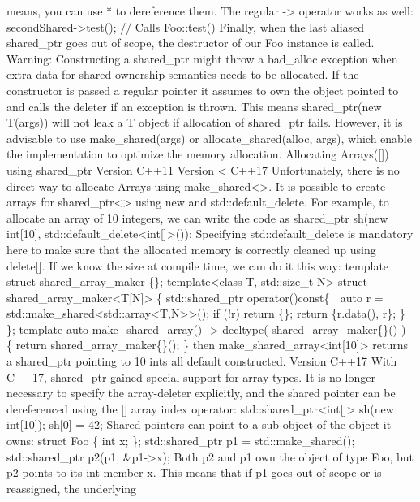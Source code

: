 means, you can use * to dereference them. The regular -\textgreater{}
operator works as well: secondShared-\textgreater test(); // Calls
Foo::test() Finally, when the last aliased shared\_ptr goes out of
scope, the destructor of our Foo instance is called. Warning:
Constructing a shared\_ptr might throw a bad\_alloc exception when extra
data for shared ownership semantics needs to be allocated. If the
constructor is passed a regular pointer it assumes to own the object
pointed to and calls the deleter if an exception is thrown. This means
shared\_ptr(new T(args)) will not leak a T object if allocation of
shared\_ptr fails. However, it is advisable to use make\_shared(args) or
allocate\_shared(alloc, args), which enable the implementation to
optimize the memory allocation. Allocating Arrays({[}{]}) using
shared\_ptr Version C++11 Version \textless{} C++17 Unfortunately, there
is no direct way to allocate Arrays using
make\_shared\textless\textgreater. It is possible to create arrays for
shared\_ptr\textless\textgreater{} using new and std::default\_delete.
For example, to allocate an array of 10 integers, we can write the code
as shared\_ptr sh(new int{[}10{]},
std::default\_delete\textless int{[}{]}\textgreater()); Specifying
std::default\_delete is mandatory here to make sure that the allocated
memory is correctly cleaned up using delete{[}{]}. If we know the size
at compile time, we can do it this way: template struct
shared\_array\_maker \{\}; template\textless class T, std::size\_t
N\textgreater{} struct
shared\_array\_maker\textless T{[}N{]}\textgreater{} \{ std::shared\_ptr
operator()const\{  auto r =
std::make\_shared\textless std::array\textless T,N\textgreater\textgreater();
if (!r) return \{\}; return \{r.data(), r\}; \} \}; template auto
make\_shared\_array() -\textgreater{} decltype(
shared\_array\_maker\{\}() ) \{ return shared\_array\_maker\{\}(); \}
then make\_shared\_array\textless int{[}10{]}\textgreater{} returns a
shared\_ptr pointing to 10 ints all default constructed. Version C++17
With C++17, shared\_ptr gained special support for array types. It is no
longer necessary to specify the array-deleter explicitly, and the shared
pointer can be dereferenced using the {[}{]} array index operator:
std::shared\_ptr\textless int{[}{]}\textgreater{} sh(new int{[}10{]});
sh{[}0{]} = 42; Shared pointers can point to a sub-object of the object
it owns: struct Foo \{ int x; \}; std::shared\_ptr p1 =
std::make\_shared(); std::shared\_ptr p2(p1, \&p1-\textgreater x); Both
p2 and p1 own the object of type Foo, but p2 points to its int member x.
This means that if p1 goes out of scope or is reassigned, the underlying
